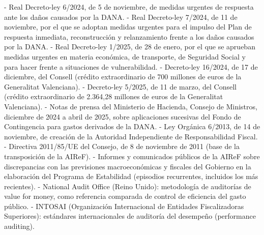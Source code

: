 \documentclass[10pt,a4paper]{article}
\begin{document}
- Real Decreto-ley 6/2024, de 5 de noviembre, de medidas urgentes de respuesta ante los daños causados por la DANA.
- Real Decreto-ley 7/2024, de 11 de noviembre, por el que se adoptan medidas urgentes para el impulso del Plan de respuesta inmediata, reconstrucción y relanzamiento frente a los daños causados por la DANA.
- Real Decreto-ley 1/2025, de 28 de enero, por el que se aprueban medidas urgentes en materia económica, de transporte, de Seguridad Social y para hacer frente a situaciones de vulnerabilidad.
- Decreto-ley 16/2024, de 17 de diciembre, del Consell (crédito extraordinario de 700 millones de euros de la Generalitat Valenciana).
- Decreto-ley 5/2025, de 11 de marzo, del Consell (crédito extraordinario de 2.364,28 millones de euros de la Generalitat Valenciana).
- Notas de prensa del Ministerio de Hacienda, Consejo de Ministros, diciembre de 2024 a abril de 2025, sobre aplicaciones sucesivas del Fondo de Contingencia para gastos derivados de la DANA.
- Ley Orgánica 6/2013, de 14 de noviembre, de creación de la Autoridad Independiente de Responsabilidad Fiscal.
- Directiva 2011/85/UE del Consejo, de 8 de noviembre de 2011 (base de la transposición de la AIReF).
- Informes y comunicados públicos de la AIReF sobre discrepancias con las previsiones macroeconómicas y fiscales del Gobierno en la elaboración del Programa de Estabilidad (episodios recurrentes, incluidos los más recientes).
- National Audit Office (Reino Unido): metodología de auditorías de value for money, como referencia comparada de control de eficiencia del gasto público.
- INTOSAI (Organización Internacional de Entidades Fiscalizadoras Superiores): estándares internacionales de auditoría del desempeño (performance auditing).


\clearpage
\end{document}
